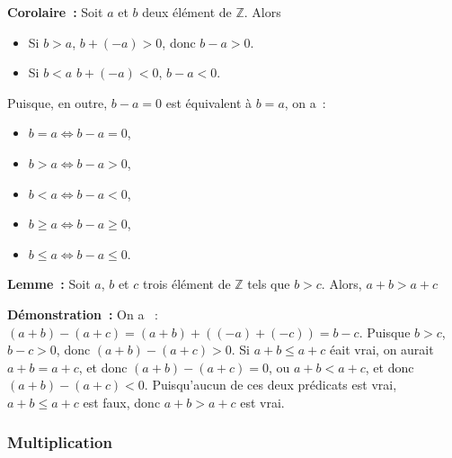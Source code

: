 \noindent\textbf{Corolaire :} Soit $a$ et $b$ deux élément de $\mathbb{Z}$. 
    Alors 
    \begin{itemize}[nosep]
        \item Si $b > a$, $b + (-a) > 0$, donc $b - a > 0$.
        \item Si $b < a$ $b + (-a) < 0$, $b - a < 0$.
    \end{itemize}
    Puisque, en outre, $b - a = 0$ est équivalent à $b = a$, on a : 
    \begin{itemize}[nosep]
        \item $b = a \Leftrightarrow b - a = 0$,
        \item $b > a \Leftrightarrow b - a > 0$,
        \item $b < a \Leftrightarrow b - a < 0$,
        \item $b \geq a \Leftrightarrow b - a \geq 0$,
        \item $b \leq a \Leftrightarrow b - a \leq 0$.
    \end{itemize}

\medskip

\noindent\textbf{Lemme :} Soit $a$, $b$ et $c$ trois élément de $\mathbb{Z}$ tels que $b > c$.
    Alors, $a + b > a + c$

\medskip

\noindent\textbf{Démonstration :} 
    On a  : $(a + b) - (a + c) = (a + b) + ((-a) + (-c)) = b - c$. 
    Puisque $b > c$, $b - c > 0$, donc $(a + b) - (a + c) > 0$.
    Si $a + b \leq a + c$ éait vrai, on aurait $a + b = a + c$, et donc $(a + b) - (a + c) = 0$, ou $a + b < a + c$, et donc $(a + b) - (a + c) < 0$. 
    Puisqu'aucun de ces deux prédicats est vrai, $a + b \leq a + c$ est faux, donc $a + b > a + c$ est vrai.

    \done

\subsubsection{Multiplication}

